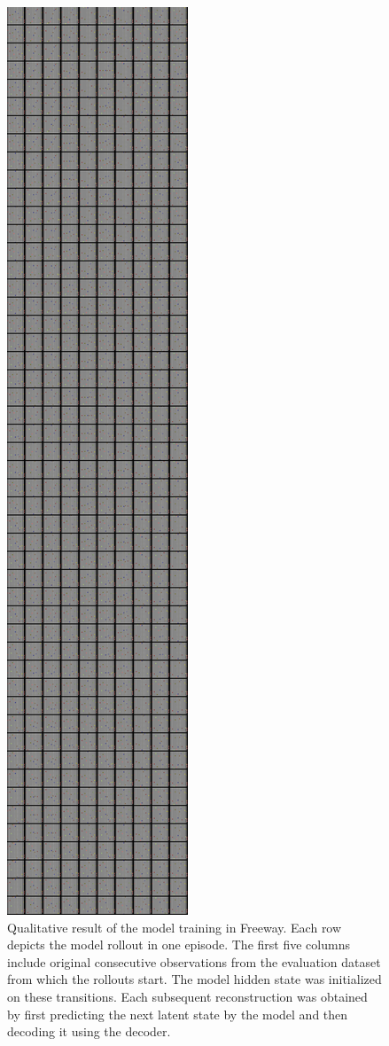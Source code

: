 \begin{figure}[H]
\includegraphics[height=0.9\textheight,keepaspectratio]{figures/PlaNet/Freeway_memory_sharp.png}
\caption[Qualitative result of the PlaNet model training with a lower divergence scale in Freeway]{Qualitative result of the model training in Freeway. Each row depicts the model rollout in one episode. The first five columns include original consecutive observations from the evaluation dataset from which the rollouts start. The model hidden state was initialized on these transitions. Each subsequent reconstruction was obtained by first predicting the next latent state by the model and then decoding it using the decoder.}
\label{Fig.PlaNet_Freeway_lower_divergence_scale}
\end{figure}

